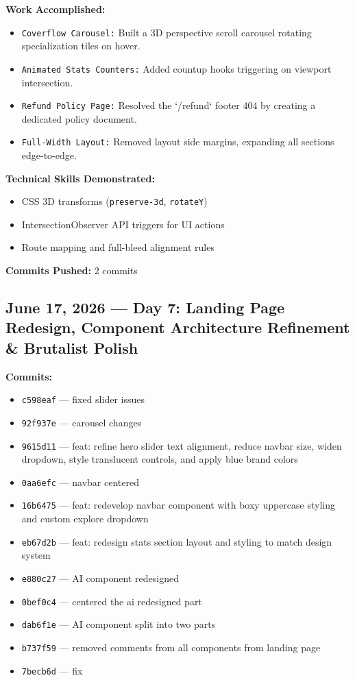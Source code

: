 \documentclass[11pt,a4paper]{article}
\begin{document}
\begin{itemize}
{\textbf{Work Accomplished:}
\begin{itemize}
  \item \texttt{Coverflow Carousel:} Built a 3D perspective scroll carousel rotating specialization tiles on hover.
  \item \texttt{Animated Stats Counters:} Added countup hooks triggering on viewport intersection.
  \item \texttt{Refund Policy Page:} Resolved the `/refund` footer 404 by creating a dedicated policy document.
  \item \texttt{Full-Width Layout:} Removed layout side margins, expanding all sections edge-to-edge.
\end{itemize}

\textbf{Technical Skills Demonstrated:}
\begin{itemize}
  \item CSS 3D transforms (\texttt{preserve-3d}, \texttt{rotateY})
  \item IntersectionObserver API triggers for UI actions
  \item Route mapping and full-bleed alignment rules
\end{itemize}

\textbf{Commits Pushed:} 2 commits

\newpage

\subsection{June 17, 2026 — Day 7: Landing Page Redesign, Component Architecture Refinement \& Brutalist Polish}

\textbf{Commits:}
\begin{itemize}
  \item \texttt{c598eaf} --- fixed slider issues
  \item \texttt{92f937e} --- carousel changes
  \item \texttt{9615d11} --- feat: refine hero slider text alignment, reduce navbar size, widen dropdown, style translucent controls, and apply blue brand colors
  \item \texttt{0aa6efc} --- navbar centered
  \item \texttt{16b6475} --- feat: redevelop navbar component with boxy uppercase styling and custom explore dropdown
  \item \texttt{eb67d2b} --- feat: redesign stats section layout and styling to match design system
  \item \texttt{e880c27} --- AI component redesigned
  \item \texttt{0bef0c4} --- centered the ai redesigned part
  \item \texttt{dab6f1e} --- AI component split into two parts
  \item \texttt{b737f59} --- removed comments from all components from landing page
  \item \texttt{7becb6d} --- fix
\end{itemize}

}
\end{itemize}
\end{document}
